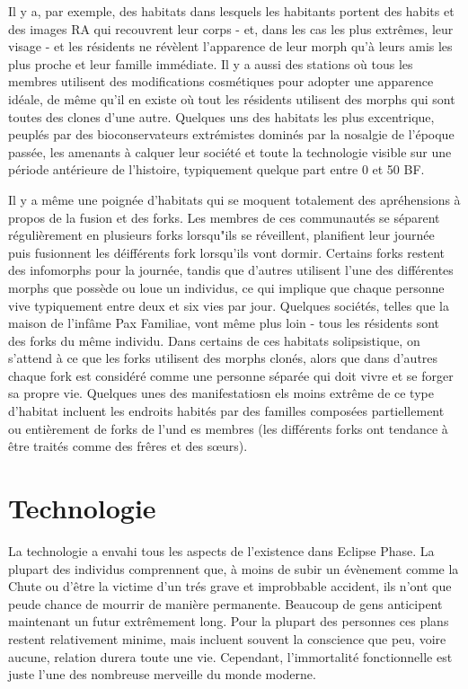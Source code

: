 Il y a, par exemple, des habitats dans lesquels les habitants portent des habits et des images RA qui recouvrent leur corps - et, dans les cas les plus extrêmes, leur visage - et les résidents ne révèlent l'apparence de leur morph qu'à leurs amis les plus proche et leur famille immédiate. Il y a aussi des stations où tous les membres utilisent des modifications cosmétiques pour adopter une apparence idéale, de même qu'il en existe où tout les résidents utilisent des morphs qui sont toutes des clones d'une autre. Quelques uns des habitats les plus excentrique, peuplés par des bioconservateurs extrémistes dominés par la nosalgie de l'époque passée, les amenants à calquer leur société et toute la technologie visible sur une période antérieure de l'histoire, typiquement quelque part entre 0 et 50 BF. 

Il y a même une poignée d'habitats qui se moquent totalement des apréhensions à propos de la fusion et des forks. Les membres de ces communautés se séparent régulièrement en plusieurs forks lorsqu"ils se réveillent, planifient leur journée puis fusionnent les déifférents fork lorsqu'ils vont dormir. Certains forks restent des infomorphs pour la journée, tandis que d'autres utilisent l'une des différentes morphs que possède ou loue un individus, ce qui implique que chaque personne vive typiquement entre deux et six vies par jour. Quelques sociétés, telles que la maison de l'infâme Pax Familiae, vont même plus loin - tous les résidents sont des forks du même individu. Dans certains de ces habitats solipsistique, on s'attend à ce que les forks utilisent des morphs clonés, alors que dans d'autres chaque fork est considéré comme une personne séparée qui doit vivre et se forger sa propre vie. Quelques unes des manifestatiosn els moins extrême de ce type d'habitat incluent les endroits habités par des familles composées partiellement ou entièrement de forks de l'und es membres (les différents forks ont tendance à être traités comme des frêres et des sœurs). 

\section{Technologie} \label{sec:technology} 

La technologie a envahi tous les aspects de l'existence dans Eclipse Phase. La plupart des individus comprennent que, à moins de subir un évènement comme la Chute ou d'être la victime d'un trés grave et improbbable accident, ils n'ont que peude chance de mourrir de manière permanente. Beaucoup de gens anticipent maintenant un futur extrêmement long. Pour la plupart des personnes ces plans restent relativement minime, mais incluent souvent la conscience que peu, voire aucune, relation durera toute une vie. Cependant, l'immortalité fonctionnelle est juste l'une des nombreuse merveille du monde moderne. 

